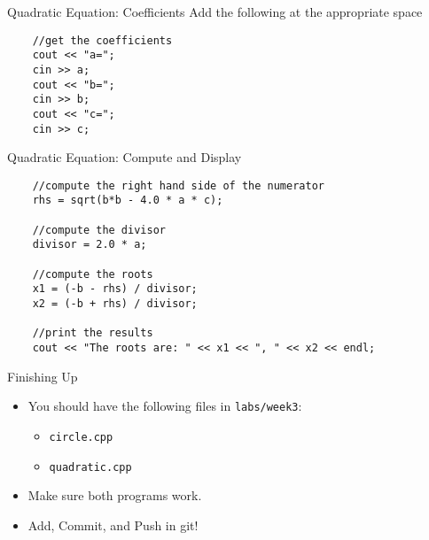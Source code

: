 \documentclass[]{beamer}
\begin{document}
\begin{frame}[fragile]{Quadratic Equation: Coefficients}
    Add the following at the appropriate space
    \newline\newline
\begin{BVerbatim}
    //get the coefficients
    cout << "a=";
    cin >> a;
    cout << "b=";
    cin >> b;
    cout << "c=";
    cin >> c;
\end{BVerbatim}
\end{frame}

\begin{frame}[fragile]{Quadratic Equation: Compute and Display}
\begin{adjustbox}{max width=0.95\textwidth, max height=0.9\textheight}
\begin{BVerbatim}
    //compute the right hand side of the numerator
    rhs = sqrt(b*b - 4.0 * a * c);

    //compute the divisor
    divisor = 2.0 * a;

    //compute the roots
    x1 = (-b - rhs) / divisor;
    x2 = (-b + rhs) / divisor;

    //print the results
    cout << "The roots are: " << x1 << ", " << x2 << endl;
\end{BVerbatim}
\end{adjustbox}
\end{frame}

\begin{frame}{Finishing Up}
    \begin{itemize}[<+->]
        \item You should have the following files in \texttt{labs/week3}:
            \begin{itemize}
                \item \texttt{circle.cpp}
                \item \texttt{quadratic.cpp}
            \end{itemize}
        \item Make sure both programs work.
        \item Add, Commit, and Push in git!
    \end{itemize}
\end{frame}
\end{document}
